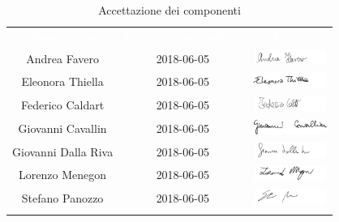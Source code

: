 \begin{longtable}{ c  c  c }
	\rowcolor{bluSOS}
	\textcolor{white}{\textbf{Nominativo}} & \textcolor{white}{\textbf{Data di accettazione}} & \textcolor{white}{\textbf{Firma}}\\
	Andrea Favero & 2018-06-05 & \includegraphics[height=0.5cm]{img/Firme/AndreaFavero.png} \\
	
	Eleonora Thiella & 2018-06-05 & \includegraphics[height=0.5cm]{img/Firme/EleonoraThiella.png} \\
	
	Federico Caldart & 2018-06-05 & \includegraphics[height=0.5cm]{img/Firme/FedericoCaldart.png} \\
	
	Giovanni Cavallin & 2018-06-05 & \includegraphics[height=0.5cm]{img/Firme/GiovanniCavallin.png} \\
	
	Giovanni Dalla Riva & 2018-06-05 & \includegraphics[height=0.5cm]{img/Firme/GiovanniDallaRiva.png} \\
	
	Lorenzo Menegon & 2018-06-05 & \includegraphics[height=0.5cm]{img/Firme/LorenzoMenegon.png} \\
	
	Stefano Panozzo & 2018-06-05 & \includegraphics[height=0.5cm]{img/Firme/StefanoPanozzo.png} \\
	\rowcolor{white}\caption{Accettazione dei componenti}\\
\end{longtable}

\newpage
